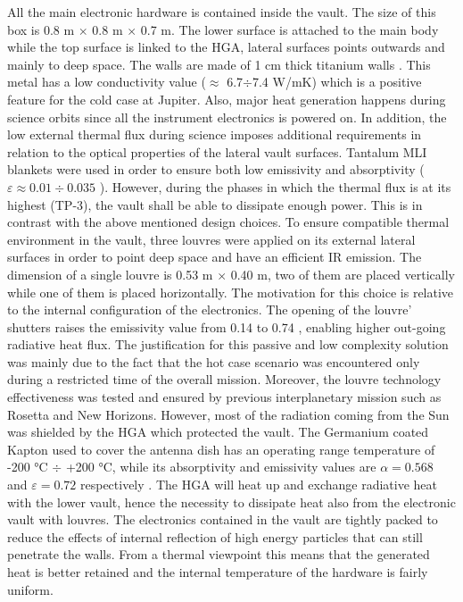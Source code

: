     All the main electronic hardware is contained inside the vault. The size of this box is 0.8 m $\times$ 0.8 m $\times$ 0.7 m. The lower surface is attached to the main body while the top surface is linked to the HGA, lateral surfaces points outwards and mainly to deep space. The walls are made of 1 cm thick titanium walls \cite{Rad_vault}. This metal has a low conductivity value ($\approx$ 6.7$\div$7.4 W/mK) which is a positive feature for the cold case at Jupiter. Also, major heat generation happens during science orbits since all the instrument electronics is powered on. In addition, the low external thermal flux during science imposes additional requirements in relation to the optical properties of the lateral vault surfaces. 
    Tantalum MLI blankets were used in order to ensure both low emissivity and absorptivity ($\varepsilon \approx 0.01 \div 0.035$ \cite{mli_blankets}). 
    However, during the phases in which the thermal flux is at its highest (TP-3), the vault shall be able to dissipate enough power. This is in contrast with the above mentioned design choices. To ensure compatible thermal environment in the vault, three louvres were applied on its external lateral surfaces in order to point deep space and have an efficient IR emission. The dimension of a single louvre is 0.53 m $\times$ 0.40 m, two of them are placed vertically while one of them is placed horizontally. The motivation for this choice is relative to the internal configuration of the electronics. The opening of the louvre' shutters raises the emissivity value from 0.14 to 0.74 , enabling higher out-going radiative heat flux.\cite{louvers}
    The justification for this passive and low complexity solution  was mainly due to the fact that the hot case scenario was encountered only during a restricted time of the overall mission. Moreover, the louvre technology effectiveness was tested and ensured by previous interplanetary mission such as Rosetta and New Horizons. 
    However, most of the radiation coming from the Sun was shielded by the HGA which protected the vault. 
    The Germanium coated Kapton used to cover the antenna dish has an operating range temperature of -200 °C $\div$ +200 °C, while its absorptivity and emissivity values are $\alpha = 0.568$ and  $\varepsilon = 0.72$ respectively \cite{ge_kapton}.
    The HGA will heat up and exchange radiative heat with the lower vault, hence the necessity to dissipate heat also from the electronic vault with louvres.
    The electronics contained in the vault are tightly packed to reduce the effects of internal reflection of high energy particles that can still penetrate the walls. From a thermal viewpoint this means that the generated heat is better retained and the internal temperature of the hardware is fairly uniform.
    
